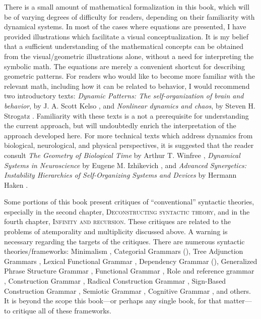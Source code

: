   There is a small amount of mathematical formalization in this book, which will be of varying degrees of difficulty for readers, depending on their familiarity with dynamical systems. In most of the cases where equations are presented, I have provided illustrations which facilitate a visual conceptualization. It is my belief that a sufficient understanding of the mathematical concepts can be obtained from the visual/geometric illustrations alone, without a need for interpreting the symbolic math. The equations are merely a convenient shortcut for describing geometric patterns. For readers who would like to become more familiar with the relevant math, including how it can be related to behavior, I would recommend two introductory texts: \textit{Dynamic Patterns: The self-organization of brain and behavior}, by J. A. Scott Kelso \citep{Kelso1997}, and \textit{Nonlinear dynamics and chaos}, by Steven H. Strogatz \citep{Strogatz2018}. Familiarity with these texts is a not a prerequisite for understanding the current approach, but will undoubtedly enrich the interpretation of the approach developed here. For more technical texts which address dynamics from biological, neurological, and physical perspectives, it is suggested that the reader consult \textit{The Geometry of Biological Time} by Arthur T. Winfree \citep{Winfree2001}, \textit{Dynamical Systems in Neuroscience} by Eugene M. Izhikevich \citep{Izhikevich2007}, and \textit{Advanced Synergetics: Instability Hierarchies of Self-Organizing Systems and Devices} by Hermann Haken \citep{Haken1983a}.

  Some portions of this book present critiques of “conventional” syntactic theories, especially in the second chapter, \textsc{Deconstructing syntactic theory,} and in the fourth chapter, \textsc{Infinity and recursion}. These critiques are related to the problems of atemporality and multiplicity discussed above. A warning is necessary regarding the targets of the critiques. There are numerous syntactic theories/frameworks: 
  Minimalism \citep{Chomsky1995}, 
  Categorial Grammars (\citealt{Steedman1993,Wood2014}), 
  Tree Adjunction Grammars \citep{Joshi1987}, 
  Lexical Functional Grammar \citep{BresnanKaplan1982}, 
  Dependency Grammar (\citealt{Hudson1977,Tesnière2018}), 
  Generalized Phrase Structure Grammar 
  \citep{GazdarEtAl1985},
  Functional Grammar \citep{Dik1981}, 
  Role and reference grammar \citep{VanValinJr2014},
  Construction Grammar \citep{Goldberg1995}, 
  Radical Construction Grammar \citep{Croft2001}, 
  Sign-Based Construction Grammar \citep{Sag2012}, 
  Semiotic Grammar \citep{Mcgregor1997}, 
  Cognitive Grammar \citep{Langacker2008}, and others. It is beyond the scope this book—or perhaps any single book, for that matter—to critique all of these frameworks.

